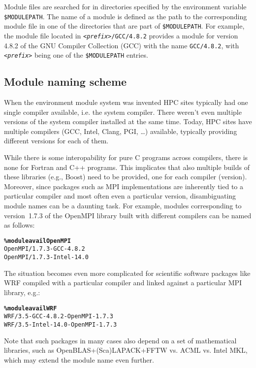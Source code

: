 Module files are searched for in directories specified by the
environment variable \texttt{\small \$MODULEPATH}. The name of a module is defined
as the path to the corresponding module file in one of the directories that are
part of \texttt{\small \$MODULEPATH}. For example, the module file located in
\texttt{\small \emph{<prefix>}/GCC/4.8.2}
provides a module for version 4.8.2 of the GNU Compiler Collection (GCC) with the
name \texttt{\small GCC/4.8.2}, with \texttt{\small\emph{<prefix>}} being one of the
\texttt{\small \$MODULEPATH} entries.

\subsection{Module naming scheme}
\label{sec:Module_naming_scheme}
When the environment module system was invented HPC sites typically had
one single compiler available, i.e. the system compiler.
There weren't even multiple versions of the system compiler installed
at the same time.  Today, HPC sites have multiple compilers (GCC, Intel,
Clang, PGI, \ldots) available, typically providing different versions for
each of them.

While there is some interopability for pure C programs across
compilers, there is none for Fortran and C++ programs.  This implicates that
also multiple builds of these libraries (e.g., Boost) need to be provided,
one for each compiler (version).
Moreover, since packages such as MPI implementations are inherently tied to a
particular compiler and most often even a particular version, disambiguating
module names can be a daunting task. For example, modules corresponding to
version~1.7.3 of the OpenMPI library built with different compilers can be named
as follows:
{\small
\begin{alltt}
    \textbf{\% module avail OpenMPI}
    OpenMPI/1.7.3-GCC-4.8.2
    OpenMPI/1.7.3-Intel-14.0\
\end{alltt}
}

The situation becomes even more complicated for scientific software
packages like WRF compiled with a particular compiler and linked
against a particular MPI library, e.g.:
{\small
\begin{alltt}
    \textbf{\% module avail WRF}
    WRF/3.5-GCC-4.8.2-OpenMPI-1.7.3
    WRF/3.5-Intel-14.0-OpenMPI-1.7.3\
\end{alltt}
}
\noindent
Note that such packages in many cases also depend on a set of mathematical
libraries, such as OpenBLAS+(Sca)LAPACK+FFTW vs. ACML vs. Intel MKL, which may
extend the module name even further.

